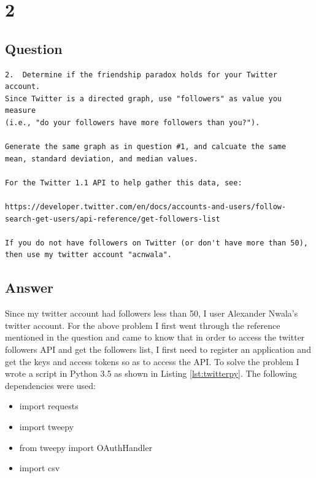 \documentclass[letterpaper,11pt]{article}
\begin{document}
\clearpage


\section*{2}

\subsection*{Question}

\begin{verbatim}
2.  Determine if the friendship paradox holds for your Twitter account.
Since Twitter is a directed graph, use "followers" as value you measure
(i.e., "do your followers have more followers than you?").

Generate the same graph as in question #1, and calcuate the same 
mean, standard deviation, and median values.

For the Twitter 1.1 API to help gather this data, see:

https://developer.twitter.com/en/docs/accounts-and-users/follow-search-get-users/api-reference/get-followers-list

If you do not have followers on Twitter (or don't have more than 50),
then use my twitter account "acnwala".

\end{verbatim}

\clearpage
\subsection*{Answer}

Since my twitter account had followers less than 50, I user Alexander Nwala's twitter account. For the above problem I first went through the reference \cite{followerref}  mentioned in the question and came to know that in order to access the twitter followers API and get the followers list, I first need to register an application and get the keys and access tokens so as to access the API.
To solve the problem I wrote a script in Python 3.5 as shown in Listing \ref{lst:twitterpy}. The following dependencies were used:

\begin{itemize}
    \item import requests
    \item import tweepy
    \item from tweepy import OAuthHandler
    \item import csv
\end{itemize}
\end{document}

